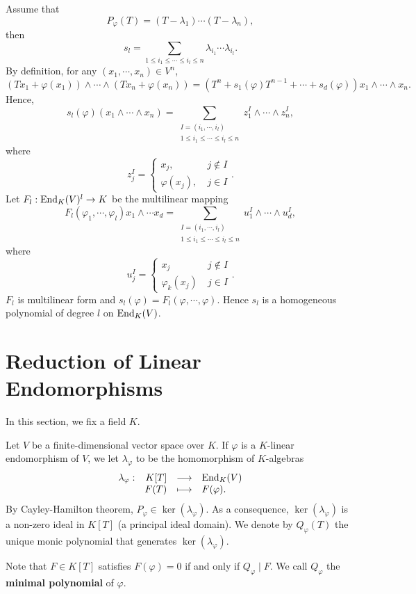\begin{remark}
    Assume that
    $$P_{\varphi} (T) = (T - \lambda_1) \cdots (T - \lambda_n),$$
    then
    $$s_{l} = \sum_{1 \le i_1 \le \cdots \le i_{l} \le n} \lambda_{i_1} \cdots \lambda_{i_{l}}.$$
    By definition, for any $(x_{1},\cdots,x_{n}) \in V^n$,
    $$(Tx_1 + \varphi(x_1)) \wedge \cdots \wedge (Tx_n + \varphi(x_n)) = (T^n + s_1(\varphi) T^{n-1} + \cdots + s_d(\varphi)) x_1 \wedge \cdots \wedge x_{n}.$$
    Hence,
    $$s_l (\varphi)(x_1 \wedge \cdots \wedge x_n) = \sum_{\substack{I = (i_1,\cdots,i_{l})\\1\le i_1 \le \cdots \le i_{l} \le n}} z_1^I \wedge \cdots \wedge z_n^I,$$
    where 
    $$z_j^I = 
    \begin{cases}
        x_j, \ &j \notin I\\
        \varphi(x_j), \ &j \in I
    \end{cases}.$$
    Let $F_{l} : \operatorname{\mathrm{End}}_{K}(V)^l \rightarrow K$ be the multilinear mapping
    $$F_{l}(\varphi_1, \cdots, \varphi_l) x_1 \wedge \cdots x_d = \sum_{\substack{I = (i_1,\cdots,i_{l})\\1\le i_1 \le \cdots \le i_{l} \le n}} u_1^I \wedge \cdots \wedge u_d^I,$$
    where 
    $$u_j^I = 
    \begin{cases}
        x_j \ &j \notin I\\
        \varphi_k(x_j) \ &j \in I
    \end{cases}.$$
    $F_l$ is multilinear form and $s_l (\varphi) = F_{l}(\varphi,\cdots,\varphi)$.
    Hence $s_l$ is a homogeneous polynomial of degree $l$ on $\operatorname{\mathrm{End}}_{K}(V)$.
\end{remark}


\section{Reduction of Linear Endomorphisms}


In this section, we fix a field $K$.

\begin{definitionenv}\label{def:6.3.1}
    Let $V$ be a finite-dimensional vector space over $K$.
    If $\varphi$ is a $K$-linear endomorphism of $V$,
    we let $\lambda_{\varphi}$ to be the homomorphism of $K$-algebras
    $$\begin{array}{rrcl}
        \lambda_{\varphi} : & K[T] & \longrightarrow & \operatorname{\mathrm{End}}_{K}(V)\\
        & F(T) & \longmapsto & F(\varphi).
    \end{array}$$
    By Cayley-Hamilton theorem, $P_{\varphi} \in \ker(\lambda_{\varphi})$.
    As a consequence, $\ker (\lambda_{\varphi})$ is a non-zero ideal in $K[T]$ (a principal ideal domain).
    We denote by $Q_{\varphi}(T)$ the unique monic polynomial that generates $\ker(\lambda_{\varphi})$.
    
    \quad Note that $F \in K[T]$ satisfies $F(\varphi) = 0$ if and only if $Q_{\varphi} \mid F$.
    We call $Q_\varphi$ the \textbf{minimal polynomial} of $\varphi$.
\end{definitionenv}

